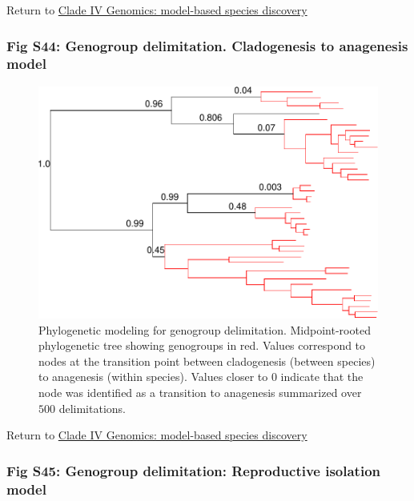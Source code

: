 \documentclass[
  11pt,
]{article}
\begin{document}
Return to \protect\hyperlink{model-based-species-discovery-7}{Clade IV Genomics: model-based species discovery}
\pagebreak

\hypertarget{fig-s44-genogroup-delimitation.-cladogenesis-to-anagenesis-model}{%
\subsubsection{Fig S44: Genogroup delimitation. Cladogenesis to anagenesis model}\label{fig-s44-genogroup-delimitation.-cladogenesis-to-anagenesis-model}}

\begin{figure}
\includegraphics[height=.6\textwidth,]{Supplementary_Material_files/figure-latex/cladeIVmolecularDelimitationsPhylogeny2-1} \caption{Phylogenetic modeling for genogroup delimitation. Midpoint-rooted phylogenetic tree showing genogroups in red. Values correspond to nodes at the transition point between cladogenesis (between species) to anagenesis (within species). Values closer to 0 indicate that the node was identified as a transition to anagenesis summarized over $500$ delimitations.}\label{fig:cladeIVmolecularDelimitationsPhylogeny2}
\end{figure}

Return to \protect\hyperlink{model-based-species-discovery-7}{Clade IV Genomics: model-based species discovery}
\pagebreak

\hypertarget{fig-s45-genogroup-delimitation-reproductive-isolation-model}{%
\subsubsection{Fig S45: Genogroup delimitation: Reproductive isolation model}\label{fig-s45-genogroup-delimitation-reproductive-isolation-model}}
\end{document}
